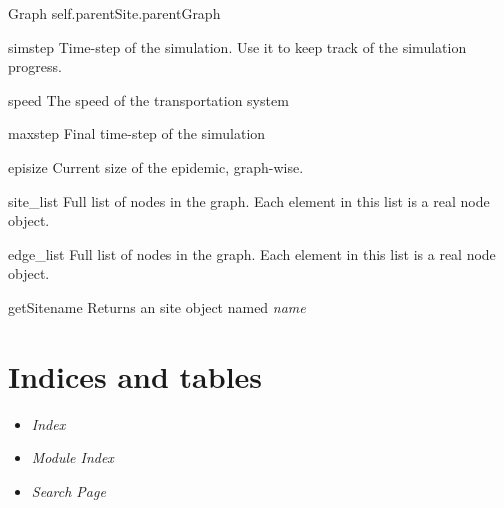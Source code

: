 \documentclass[a4paper,10pt]{manual}
\begin{document}
\hypertarget{Graph}{}\begin{classdesc}{Graph}{}
self.parentSite.parentGraph


\hypertarget{Graph.simstep}{}\begin{memberdesc}{simstep}
Time-step of the simulation. Use it to keep track of the simulation progress.
\end{memberdesc}


\hypertarget{Graph.speed}{}\begin{memberdesc}{speed}
The speed of the transportation system
\end{memberdesc}


\hypertarget{Graph.maxstep}{}\begin{memberdesc}{maxstep}
Final time-step of the simulation
\end{memberdesc}


\hypertarget{Graph.episize}{}\begin{memberdesc}{episize}
Current size of the epidemic, graph-wise.
\end{memberdesc}


\hypertarget{Graph.site_list}{}\begin{memberdesc}{site\_list}
Full list of nodes in the graph. Each element in this list is a real node object.
\end{memberdesc}


\hypertarget{Graph.edge_list}{}\begin{memberdesc}{edge\_list}
Full list of nodes in the graph. Each element in this list is a real node object.
\end{memberdesc}


\hypertarget{Graph.getSite}{}\begin{methoddesc}{getSite}{name}
Returns an site object named \emph{name}
\end{methoddesc}
\end{classdesc}


\chapter{Indices and tables}
\begin{itemize}
\item {} 
\emph{Index}

\item {} 
\emph{Module Index}

\item {} 
\emph{Search Page}

\end{itemize}
\renewcommand{\indexname}{Module Index}\printmodindex\renewcommand{\indexname}{Index}

\printindex
\end{document}
